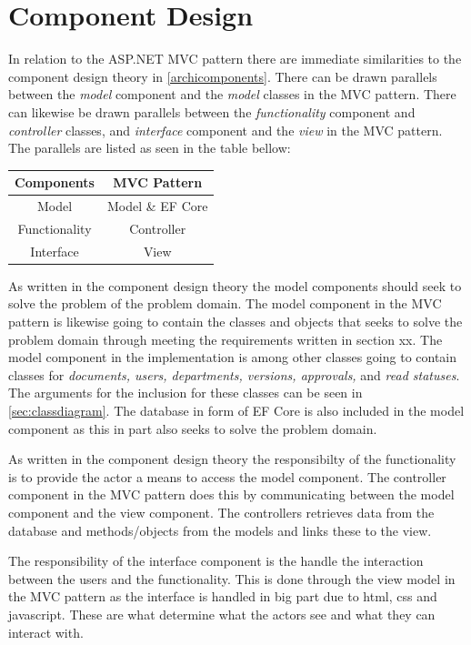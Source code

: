 \section{Component Design}

In relation to the ASP.NET MVC pattern there are immediate similarities to the component design theory in \cref{archicomponents}.
There can be drawn parallels between the \textit{model} component and the \textit{model} classes in the MVC pattern.
There can likewise be drawn parallels between the \textit{functionality} component and \textit{controller} classes, and \textit{interface} component and the \textit{view} in the MVC pattern.
The parallels are listed as seen in the table bellow:

\begin{center}
	\begin{tabular}{| c | c | }
	\hline
	\textbf{Components} & \textbf{MVC Pattern} \\
	\hline
	Model & Model \& EF Core \\
	\hline
	Functionality & Controller \\
	\hline
	Interface & View \\
	\hline
\end{tabular}
\end{center}

As written in the component design theory the model components should seek to solve the problem of the problem domain.
The model component in the MVC pattern is likewise going to contain the classes and objects that seeks to solve the problem domain through meeting the requirements written in section xx.
The model component in the implementation is among other classes going to contain classes for \textit{documents, users, departments, versions, approvals,} and \textit{read statuses}.
The arguments for the inclusion for these classes can be seen in \cref{sec:classdiagram}.
The database in form of EF Core is also included in the model component as this in part also seeks to solve the problem domain.

As written in the component design theory the responsibilty of the functionality is to provide the actor a means to access the model component.
The controller component in the MVC pattern does this by communicating between the model component and the view component.
The controllers retrieves data from the database and methods/objects from the models and links these to the view.

The responsibility of the interface component is the handle the interaction between the users and the functionality.
This is done through the view model in the MVC pattern as the interface is handled in big part due to html, css and javascript.
These are what determine what the actors see and what they can interact with.

